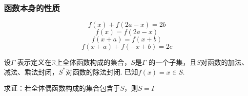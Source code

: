 \subsubsection*{函数本身的性质}
\[f(x)+f(2a-x)=2b\]
\[f(x)=f(2a-x)\]
\[f(x+a)=f(x+b)\]
\[f(x+a)+f(-x+b)=2c\]

\clearpage
\hw
\begin{homework}
    设$\Gamma$ 表示定义在$\mathbb{R}$上全体函数构成的集合，$S$是$\Gamma$
    的一个子集，且$S$对函数的加法、减法、乘法封闭，$S^*$对函数的除法封闭.
    已知$f(x)=x\in S$.
    
    求证：若全体偶函数构成的集合包含于$S$，则$S=\Gamma$
\end{homework}
\clearpage


\clearpage

